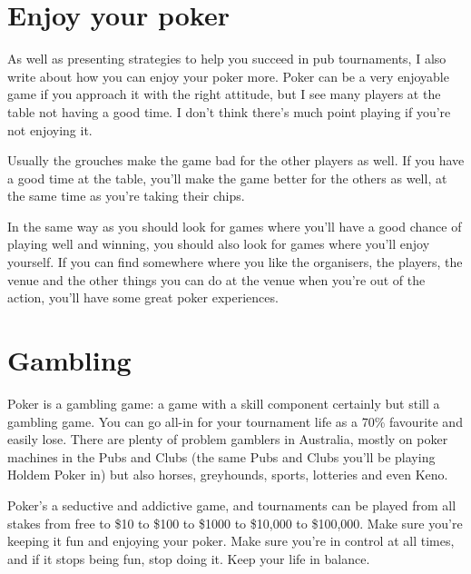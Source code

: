 
\section{Enjoy your poker}

As well as presenting strategies to help you succeed
in pub tournaments,
I also write about how you can enjoy your poker
more. Poker can be a very enjoyable game if you approach
it with the right attitude, but I see many players at the table
not having a good time. I don't think there's much
point playing if you're not enjoying it.

Usually the grouches make the game bad for the other
players as well. If you have a good time at the table, you'll make the
game better for the others as well, at the same time as you're taking
their chips.

In the same way as you should look for games where you'll have
a good chance of playing well and winning, you should
also look for games where you'll enjoy yourself.
If you can find somewhere where you like
the organisers, the players, the venue and the other things
you can do at the venue when you're out of the action,
you'll have some great poker experiences.

\section{Gambling}

Poker is a gambling
game: a game with a skill component certainly but still
a gambling game. You can go all-in for your tournament life
as a 70\% favourite and easily lose. There are plenty of problem gamblers
in Australia, mostly on poker machines in the Pubs and Clubs
(the same Pubs and Clubs you'll be playing Holdem Poker
in) but also horses, greyhounds, sports, lotteries and even Keno.

Poker's a seductive and addictive game,
and tournaments can be played from all stakes from free to \$10 to \$100
to \$1000 to \$10,000 to \$100,000. Make sure you're keeping it fun
and enjoying your poker. Make sure you're in control at all times,
and if it stops being fun, stop doing it. Keep your life in balance.



